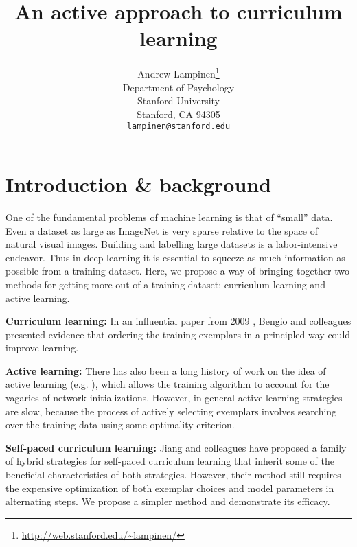 \documentclass{article}
\title{An active approach to curriculum learning}
\author{
  Andrew Lampinen\thanks{\url{http://web.stanford.edu/\~lampinen/}}  \\
  Department of Psychology\\
  Stanford University\\
  Stanford, CA 94305 \\
  \texttt{lampinen@stanford.edu} \\
}
\begin{document}

\maketitle


\section{Introduction \& background}
One of the fundamental problems of machine learning is that of ``small'' data. Even a dataset as large as ImageNet 
is very sparse relative to the space of natural visual images. Building and labelling large datasets is a labor-intensive endeavor. Thus in deep learning it is essential to squeeze as much information as possible from a training dataset. Here, we propose a way of bringing together two methods for getting more out of a training dataset: curriculum learning and active learning.\par
\textbf{Curriculum learning:} In an influential paper from 2009 \cite{Bengio2009}, Bengio and colleagues presented evidence that ordering the training exemplars in a principled way could improve learning. 
\par
\textbf{Active learning:} There has also been a long history of work on the idea of active learning (e.g. \cite{Fukumizu2000}), which allows the training algorithm to account for the vagaries of network initializations. However, in general active learning strategies are slow, because the process of actively selecting exemplars involves searching over the training data using some optimality criterion.\par
\textbf{Self-paced curriculum learning:} Jiang and colleagues \cite{Jiang2015} have proposed a family of hybrid strategies for self-paced curriculum learning that inherit some of the beneficial characteristics of both strategies. However, their method still requires the expensive optimization of both exemplar choices and model parameters in alternating steps. We propose a simpler method and demonstrate its efficacy. 
\end{document}
